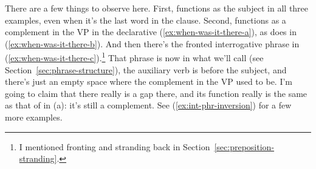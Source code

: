 \ea \label{ex:when-was-it-there}
    \label{ex:when-was-it-there-a}
    \label{ex:when-was-it-there-b}
    \label{ex:when-was-it-there-c}
    \z
\z
There are a few things to observe here. First,  functions as the subject in all three examples, even when it's the last word in the clause. Second,  functions as a complement in the VP in the declarative (\ref{ex:when-was-it-there-a}), as does  in (\ref{ex:when-was-it-there-b}). And then there's the fronted interrogative phrase in (\ref{ex:when-was-it-there-c}).\footnote{I mentioned fronting and stranding back in Section~\ref{sec:preposition-stranding}.} That phrase is now in what we'll call  (see Section~\ref{sec:phrase-structure}), the auxiliary verb is before the subject, and there's just an empty space where the complement in the VP used to be. I'm going to claim that there really is a gap there, and its function really is the same as that of  in (a): it's still a complement. See (\ref{ex:int-phr-inversion}) for a few more examples.

